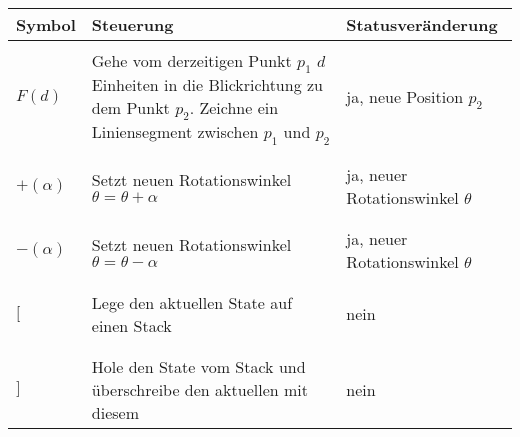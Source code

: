 \begin{center}
    \begin{tabular}{lll}
        \textbf{Symbol} & \textbf{Steuerung} & \textbf{Statusveränderung} \\
        \hline \\
        $F(d)$ &
        \begin{minipage}{0.6\textwidth}
            Gehe vom derzeitigen Punkt $p_1$ $d$ Einheiten in die Blickrichtung zu dem Punkt $p_2$.
            Zeichne ein Liniensegment zwischen $p_1$ und $p_2$
        \end{minipage} &
        \begin{minipage}{0.4\textwidth}
            ja, neue Position $p_2$
        \end{minipage} \\
        \\ \hline \\
        $+(\alpha)$ &
        \begin{minipage}{0.6\textwidth}
            Setzt neuen Rotationswinkel $\theta=\theta+\alpha$
        \end{minipage} &
        \begin{minipage}{0.4\textwidth}
            ja, neuer Rotationswinkel $\theta$
        \end{minipage} \\
        \\ \hline \\
        $-(\alpha)$ &
        \begin{minipage}{0.6\textwidth}
            Setzt neuen Rotationswinkel $\theta=\theta-\alpha$
        \end{minipage} &
        \begin{minipage}{0.4\textwidth}
            ja, neuer Rotationswinkel $\theta$
        \end{minipage} \\
        \\ \hline \\
        $[$ &
        \begin{minipage}{0.6\textwidth}
            Lege den aktuellen State auf einen Stack
        \end{minipage} &
        \begin{minipage}{0.4\textwidth}
            nein
        \end{minipage} \\
        \\ \hline \\
        $]$ &
        \begin{minipage}{0.6\textwidth}
            Hole den State vom Stack und überschreibe den aktuellen mit diesem
        \end{minipage} &
        \begin{minipage}{0.4\textwidth}
            nein
        \end{minipage}
    \end{tabular}
\end{center}
